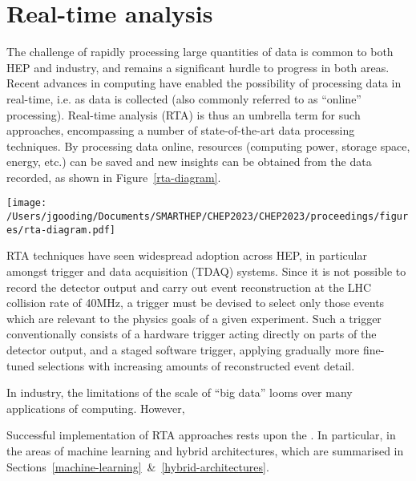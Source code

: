 \section{Real-time analysis}
\label{rta}
The challenge of rapidly processing large quantities of data is common to both HEP and industry, and remains a significant hurdle to progress in both areas. \cite{hu-big-data} Recent advances in computing have enabled the possibility of processing data in real-time, i.e. as data is collected (also commonly referred to as ``online'' processing). \cite{real-time-computing} Real-time analysis (RTA) is thus an umbrella term for such approaches, encompassing a number of state-of-the-art data processing techniques. By processing data online, resources (computing power, storage space, energy, etc.) can be saved and new insights can be obtained from the data recorded, as shown in Figure~\ref{rta-diagram}.\par


\begin{figure*}[h!]
    \centering
    \texttt{[image: /Users/jgooding/Documents/SMARTHEP/CHEP2023/CHEP2023/proceedings/figures/rta-diagram.pdf]}
    \caption{The traditional and real-time analysis approaches to processing raw data. Traditional approaches rely on recording all data and processing this offilne. Real-time analysis reverses this, processing data as it is produced and recording only the relevant processed information, enabling larger volumes of processed data to be stored.}
    \label{rta-diagram}       %
\end{figure*}
RTA techniques have seen widespread adoption across HEP, in particular amongst trigger and data acquisition (TDAQ) systems. Since it is not possible to record the detector output and carry out event reconstruction at the LHC collision rate of {40}{MHz}, a trigger must be devised to select only those events which are relevant to the physics goals of a given experiment. Such a trigger conventionally consists of a hardware trigger acting directly on parts of the detector output, and a staged software trigger, applying gradually more fine-tuned selections with increasing amounts of reconstructed event detail.\par
In industry, the limitations of the scale of ``big data'' looms over many applications of computing. However, \par
Successful implementation of RTA approaches rests upon the . In particular, in the areas of machine learning and hybrid architectures, which are summarised in Sections~\ref{machine-learning}~\&~\ref{hybrid-architectures}.

